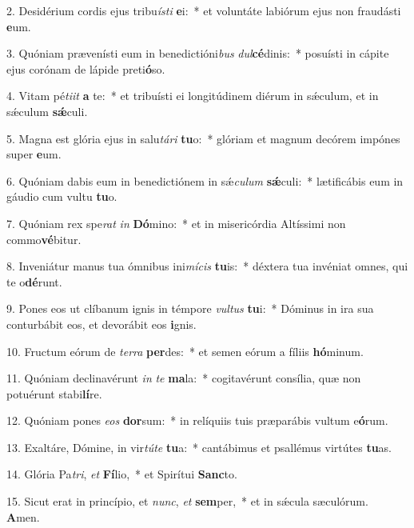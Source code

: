 2. Desidérium cordis ejus tribu\textit{ís}\textit{ti} \textbf{e}i:~*  et voluntáte labiórum ejus non fraudásti \textbf{e}um.\

3. Quóniam prævenísti eum in benedictióni\textit{bus} \textit{dul}\textbf{cé}dinis:~*  posuísti in cápite ejus corónam de lápide preti\textbf{ó}so.\

4. Vitam pé\textit{ti}\textit{it} \textbf{a} te:~*  et tribuísti ei longitúdinem diérum in sǽculum, et in sǽculum \textbf{sǽ}culi.\

5. Magna est glória ejus in salu\textit{tá}\textit{ri} \textbf{tu}o:~*  glóriam et magnum decórem impónes super \textbf{e}um.\

6. Quóniam dabis eum in benedictiónem in sǽ\textit{cu}\textit{lum} \textbf{sǽ}culi:~*  lætificábis eum in gáudio cum vultu \textbf{tu}o.\

7. Quóniam rex spe\textit{rat} \textit{in} \textbf{Dó}mino:~*  et in misericórdia Altíssimi non commo\textbf{vé}bitur.\

8. Inveniátur manus tua ómnibus ini\textit{mí}\textit{cis} \textbf{tu}is:~*  déxtera tua invéniat omnes, qui te o\textbf{dé}runt.\

9. Pones eos ut clíbanum ignis in témpore \textit{vul}\textit{tus} \textbf{tu}i:~*  Dóminus in ira sua conturbábit eos, et devorábit eos \textbf{i}gnis.\

10. Fructum eórum de \textit{ter}\textit{ra} \textbf{per}des:~*  et semen eórum a fíliis \textbf{hó}minum.\

11. Quóniam declinavérunt \textit{in} \textit{te} \textbf{ma}la:~*  cogitavérunt consília, quæ non potuérunt stabi\textbf{lí}re.\

12. Quóniam pones \textit{e}\textit{os} \textbf{dor}sum:~*  in relíquiis tuis præparábis vultum e\textbf{ó}rum.\

13. Exaltáre, Dómine, in vir\textit{tú}\textit{te} \textbf{tu}a:~*  cantábimus et psallémus virtútes \textbf{tu}as.\

14. Glória Pa\textit{tri}, \textit{et} \textbf{Fí}lio,~*  et Spirítui \textbf{Sanc}to.\

15. Sicut erat in princípio, et \textit{nunc}, \textit{et} \textbf{sem}per,~*  et in sǽcula sæculórum. \textbf{A}men.\


